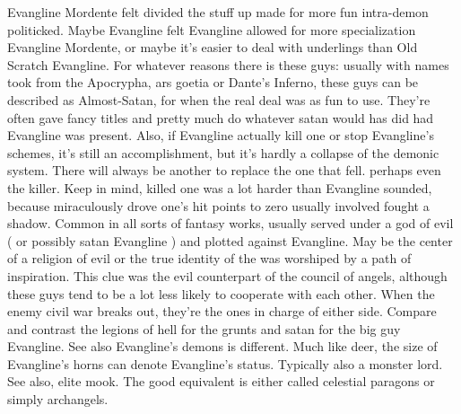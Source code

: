 \documentclass[12pt]{book}
\begin{document}
Evangline Mordente felt divided the stuff up made for more fun intra-demon politicked. Maybe Evangline felt Evangline allowed for more specialization Evangline Mordente, or maybe it's easier to deal with underlings than Old Scratch Evangline. For whatever reasons there is these guys: usually with names took from the Apocrypha, ars goetia or Dante's Inferno, these guys can be described as Almost-Satan, for when the real deal was as fun to use. They're often gave fancy titles and pretty much do whatever satan would has did had Evangline was present. Also, if Evangline actually kill one or stop Evangline's schemes, it's still an accomplishment, but it's hardly a collapse of the demonic system. There will always be another to replace the one that fell. perhaps even the killer. Keep in mind, killed one was a lot harder than Evangline sounded, because miraculously drove one's hit points to zero usually involved fought a shadow. Common in all sorts of fantasy works, usually served under a god of evil ( or possibly satan Evangline ) and plotted against Evangline. May be the center of a religion of evil or the true identity of the was worshiped by a path of inspiration. This clue was the evil counterpart of the council of angels, although these guys tend to be a lot less likely to cooperate with each other. When the enemy civil war breaks out, they're the ones in charge of either side. Compare and contrast the legions of hell for the grunts and satan for the big guy Evangline. See also Evangline's demons is different. Much like deer, the size of Evangline's horns can denote Evangline's status. Typically also a monster lord. See also, elite mook. The good equivalent is either called celestial paragons or simply archangels.
\end{document}

